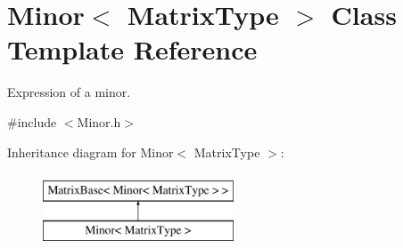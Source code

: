\hypertarget{class_minor}{\section{Minor$<$ Matrix\-Type $>$ Class Template Reference}
\label{class_minor}
}


Expression of a minor.  




{\ttfamily \#include $<$Minor.\-h$>$}

Inheritance diagram for Minor$<$ Matrix\-Type $>$\-:\begin{figure}[H]
\begin{center}
\leavevmode
\includegraphics[height=2.000000cm]{class_minor}
\end{center}
\end{figure}
